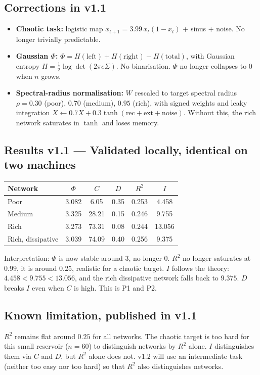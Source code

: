 \documentclass[11pt,a4paper]{article}
\begin{document}
\subsection{Corrections in v1.1}
\begin{itemize}
\item \textbf{Chaotic task:} logistic map $x_{t+1}=3.99\,x_t(1-x_t)$ + sinus + noise. No longer trivially predictable.
\item \textbf{Gaussian $\Phi$:} $\Phi = H(\text{left}) + H(\text{right}) - H(\text{total})$, with Gaussian entropy $H = \frac{1}{2}\log\det(2\pi e \Sigma)$. No binarisation. $\Phi$ no longer collapses to $0$ when $n$ grows.
\item \textbf{Spectral-radius normalisation:} $W$ rescaled to target spectral radius $\rho = 0.30$ (poor), $0.70$ (medium), $0.95$ (rich), with signed weights and leaky integration $X \leftarrow 0.7X + 0.3\tanh(\text{rec}+\text{ext}+\text{noise})$. Without this, the rich network saturates in $\tanh$ and loses memory.
\end{itemize}

\subsection{Results v1.1 --- Validated locally, identical on two machines}
\begin{center}
\begin{tabular}{lccccc}
\hline
Network & $\Phi$ & $C$ & $D$ & $R^2$ & $I$ \\
\hline
Poor & 3.082 & 6.05 & 0.35 & 0.253 & 4.458 \\
Medium & 3.325 & 28.21 & 0.15 & 0.246 & 9.755 \\
Rich & 3.273 & 73.31 & 0.08 & 0.244 & 13.056 \\
Rich, dissipative & 3.039 & 74.09 & 0.40 & 0.256 & 9.375 \\
\hline
\end{tabular}
\end{center}

Interpretation: $\Phi$ is now stable around $3$, no longer $0$. $R^2$ no longer saturates at $0.99$, it is around $0.25$, realistic for a chaotic target. $I$ follows the theory: $4.458 < 9.755 < 13.056$, and the rich dissipative network falls back to $9.375$. $D$ breaks $I$ even when $C$ is high. This is P1 and P2.

\subsection{Known limitation, published in v1.1}
$R^2$ remains flat around $0.25$ for all networks. The chaotic target is too hard for this small reservoir ($n=60$) to distinguish networks by $R^2$ alone. $I$ distinguishes them via $C$ and $D$, but $R^2$ alone does not. v1.2 will use an intermediate task (neither too easy nor too hard) so that $R^2$ also distinguishes networks.
\end{document}
